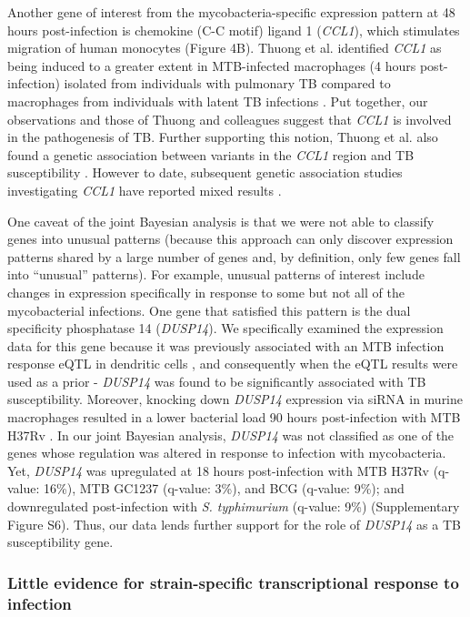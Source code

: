 Another gene of interest from the mycobacteria-specific expression
pattern at 48 hours post-infection is chemokine (C-C motif) ligand 1
(\emph{CCL1}), which stimulates migration of human monocytes
\citep{Miller1992} (Figure 4B). Thuong et al. identified \emph{CCL1} as
being induced to a greater extent in MTB-infected macrophages (4 hours
post-infection) isolated from individuals with pulmonary TB compared to
macrophages from individuals with latent TB infections
\citep{Thuong2008}. Put together, our observations and those of Thuong
and colleagues suggest that \emph{CCL1} is involved in the pathogenesis
of TB. Further supporting this notion, Thuong et al. also found a
genetic association between variants in the \emph{CCL1} region and TB
susceptibility \citep{Thuong2008}. However to date, subsequent genetic
association studies investigating \emph{CCL1} have reported mixed
results \citep{Tang2011, Ozdemir2013}.

One caveat of the joint Bayesian analysis is that we were not able to
classify genes into unusual patterns (because this approach can only
discover expression patterns shared by a large number of genes and, by
definition, only few genes fall into ``unusual'' patterns). For example,
unusual patterns of interest include changes in expression specifically
in response to some but not all of the mycobacterial infections. One
gene that satisfied this pattern is the dual specificity phosphatase 14
(\emph{DUSP14}). We specifically examined the expression data for this
gene because it was previously associated with an MTB infection response
eQTL in dendritic cells \citep{Barreiro2012}, and consequently when the
eQTL results were used as a prior - \emph{DUSP14} was found to be
significantly associated with TB susceptibility. Moreover, knocking down
\emph{DUSP14} expression via siRNA in murine macrophages resulted in a
lower bacterial load 90 hours post-infection with MTB H37Rv
\citep{Jayaswal2010}. In our joint Bayesian analysis, \emph{DUSP14} was
not classified as one of the genes whose regulation was altered in
response to infection with mycobacteria. Yet, \emph{DUSP14} was
upregulated at 18 hours post-infection with MTB H37Rv (q-value: 16\%),
MTB GC1237 (q-value: 3\%), and BCG (q-value: 9\%); and downregulated
post-infection with \emph{S. typhimurium} (q-value: 9\%) (Supplementary
Figure S6). Thus, our data lends further support for the role of
\emph{DUSP14} as a TB susceptibility gene.

\subsubsection{Little evidence for strain-specific transcriptional
response to
infection}\label{little-evidence-for-strain-specific-transcriptional-response-to-infection}

